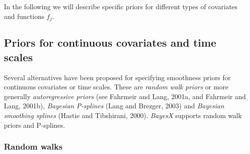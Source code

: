 \documentclass[11pt,a4paper,twoside]{bayesxarticle}
\begin{document}
In the following we will describe specific priors for different
types of covariates and functions $f_j$.


\subsection{Priors for continuous covariates and time scales}
\label{psplines}

Several alternatives have been  proposed for specifying smoothness
priors for continuous covariates or time scales. These are {\em
random walk priors} or more generally {\em autoregressive priors}
(see Fahrmeir and Lang, 2001a, and Fahrmeir and Lang, 2001b), {\em
Bayesian P-splines} (Lang and Brezger, 2003) and {\em Bayesian
smoothing splines} (Hastie and Tibshirani, 2000). {\em BayesX}
supports random walk priors and P-splines.

\subsubsection{Random walks}
\end{document}
